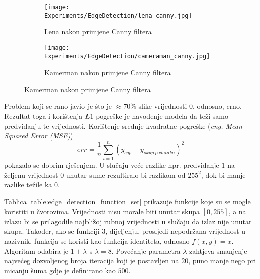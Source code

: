 \begin{figure}
	\centering
	\caption{Fotografije Lene i Kamermana nakon primjene detekcije ruba \emph{Canny} algoritmom}
	\begin{subfigure}[t]{0.45\textwidth}
		\texttt{[image: Experiments/EdgeDetection/lena\_canny.jpg]}
		\caption{Lena nakon primjene Canny filtera}
		\label{fig:lena_canny}
	\end{subfigure}
	\begin{subfigure}[t]{0.45\textwidth}
		\texttt{[image: Experiments/EdgeDetection/cameraman\_canny.jpg]}
		\caption{Kamerman nakon primjene Canny filtera}
		\label{fig:camerman_canny}
	\end{subfigure}
	\label{fig:edge_detection_train_val_in}
\end{figure}

Problem koji se rano javio je što je $\approx 70\%$ slike vrijednosti $0$, odnosno, crno.
Rezultat toga i korištenja $L1$ pogreške je navođenje modela da teži samo predviđanju te vrijednosti.
Korištenje srednje kvadratne pogreške (\emph{eng. Mean Squared Error (MSE)})
$$err = \frac{1}{n}\sum_{i=1}^{n}(y_{cgp} - y_{skup\ podataka})^2$$
pokazalo se dobrim rješenjem.
U slučaju veće razlike npr. predviđanje $1$ na željenu vrijednost $0$ unutar sume rezultiralo bi razlikom od $255^2$, dok bi manje razlike težile ka $0$.

Tablica \ref{table:edge_detection_function_set} prikazuje funkcije koje su se mogle koristiti u čvorovima.
Vrijednosti nisu morale biti unutar skupa $[0, 255]$, a na izlazu bi se prilagodile najbližoj rubnoj vrijednosti u slučaju da izlaz nije unutar skupa.
Također, ako se funkciji $3$, dijeljenju, prosljedi nepodržana vrijednost u nazivnik, funkcija se koristi kao funkcija identiteta, odnosno $f(x, y) = x$.
Algoritam odabira je $1 + \lambda$ s $\lambda = 8$.
Povećanje parametra $\lambda$ zahtjeva smanjenje najvećeg dozvoljenog broja iteracija koji je postavljen na $20$, puno manje nego pri micanju šuma gdje je definirano kao $500$.

